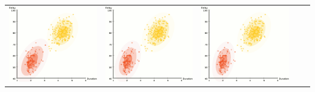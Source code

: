 \documentclass{beamer}
\begin{document}
\begin{frame}
{\begin{tabular}{ccccc}
\includegraphics[scale=0.2]{em/frame_06_delay-0}&
\includegraphics[scale=0.2]{em/frame_07_delay-0}&
\includegraphics[scale=0.2]{em/frame_08_delay-0}&

\end{tabular}}
\end{frame}
\end{document}
